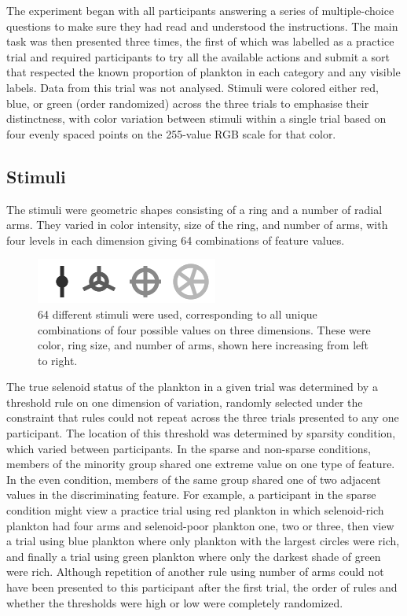 \documentclass[10pt,letterpaper]{article}
\begin{document}
The experiment began with all participants answering a series of multiple-choice questions to make sure they had read and understood the instructions. The main task was then presented three times, the first of which was labelled as a practice trial and required participants to try all the available actions and submit a sort that respected the known proportion of plankton in each category and any visible labels. Data from this trial was not analysed. Stimuli were colored either red, blue, or green (order randomized) across the three trials to emphasise their distinctness, with color variation between stimuli within a single trial based on four evenly spaced points on the 255-value RGB scale for that color.


\subsection{Stimuli}
The stimuli were geometric shapes consisting of a ring and a number of radial arms. They varied in color intensity, size of the ring, and number of arms, with four levels in each dimension giving 64 combinations of feature values.

\begin{figure}[t]
\centering
\includegraphics[width=.3\textwidth]{minstim_bw.png}
\caption{64 different stimuli were used, corresponding to all unique combinations of four possible values on three dimensions. These were color, ring size, and number of arms, shown here increasing from left to right.}
\end{figure}

The true selenoid status of the plankton in a given trial was determined by a threshold rule on one dimension of variation, randomly selected under the constraint that rules could not repeat across the three trials presented to any one participant. The location of this threshold was determined by sparsity condition, which varied between participants. In the {\sc sparse} and {\sc non-sparse} conditions, members of the minority group shared one extreme value on one type of feature. In the {\sc even} condition, members of the same group shared one of two adjacent values in the discriminating feature. For example, a participant in the {\sc sparse} condition might view a practice trial using red plankton in which selenoid-rich plankton had four arms and selenoid-poor plankton one, two or three, then view a trial using blue plankton where only plankton with the largest circles were rich, and finally a trial using green plankton where only the darkest shade of green were rich. Although repetition of another rule using number of arms could not have been presented to this participant after the first trial, the order of rules and whether the thresholds were high or low were completely randomized.
\end{document}

